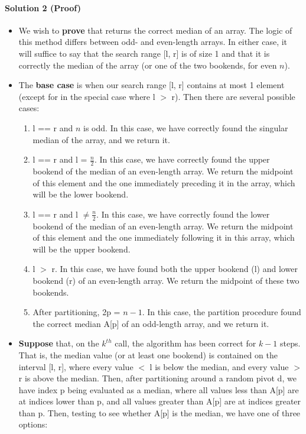 \documentclass[11pt]{article}
\begin{document}
\paragraph{Solution 2 (Proof)}

\begin{itemize}
    \item We wish to \textbf{prove} that  returns the correct median of an array. The logic of this method differs between odd- and even-length arrays. In either case, it will suffice to say that the search range [l, r] is of size 1 and that it is correctly the median of the array (or one of the two bookends, for even $n$).
    \item The \textbf{base case} is when our search range [l, r] contains at most 1 element (except for in the special case where l $>$ r). Then there are several possible cases: \begin{enumerate}
        \item l == r and $n$ is odd. In this case, we have correctly found the singular median of the array, and we return it.
        \item l == r and l = $\frac{n}{2}$. In this case, we have correctly found the upper bookend of the median of an even-length array. We return the midpoint of this element and the one immediately preceding it in the array, which will be the lower bookend.
        \item l == r and l $\neq \frac{n}{2}$. In this case, we have correctly found the lower bookend of the median of an even-length array. We return the midpoint of this element and the one immediately following it in this array, which will be the upper bookend.
        \item l $>$ r. In this case, we have found both the upper bookend (l) and lower bookend (r) of an even-length array. We return the midpoint of these two bookends.
        \item After partitioning, 2p = $n - 1$. In this case, the partition procedure found the correct median A[p] of an odd-length array, and we return it.
    \end{enumerate}
    \item \textbf{Suppose} that, on the $k^{th}$ call, the algorithm has been correct for $k - 1$ steps. That is, the median value (or at least one bookend) is contained on the interval [l, r], where every value $<$ l is below the median, and every value $>$ r is above the median. Then, after partitioning around a random pivot d, we have index p being evaluated as a median, where all values less than A[p] are at indices lower than p, and all values greater than A[p] are at indices greater than p. Then, testing to see whether A[p] is the median, we have one of three options: \begin{enumerate}

\end{enumerate}
\end{itemize}
\end{document}
